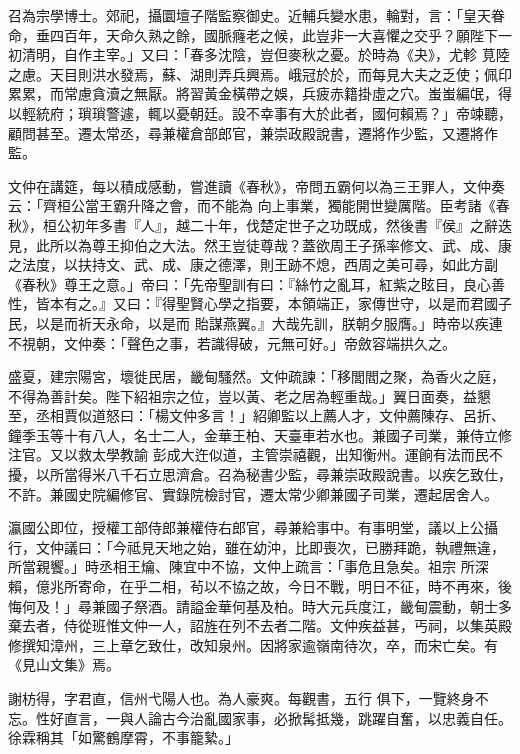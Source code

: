 \begin{pinyinscope}
 召為宗學博士。郊祀，攝圜壇子階監察御史。近輔兵變水患，輪對，言：「皇天眷命，垂四百年，天命久熟之餘，國脈癃老之候，此豈非一大喜懼之交乎？願陛下一初清明，自作主宰。」又曰：「春多沈陰，豈但麥秋之憂。於時為《夬》，尤軫
 莧陸之慮。天目則洪水發焉，蘇、湖則弄兵興焉。峨冠於於，而每見大夫之乏使；佩印累累，而常慮貪瀆之無厭。將習黃金橫帶之娛，兵疲赤籍掛虛之穴。蚩蚩編氓，得以輕統府；瑣瑣警遽，輒以憂朝廷。設不幸事有大於此者，國何賴焉？」帝竦聽，顧問甚至。遷太常丞，尋兼權倉部郎官，兼崇政殿說書，遷將作少監，又遷將作監。



 文仲在講筵，每以積成感動，嘗進讀《春秋》，帝問五霸何以為三王罪人，文仲奏云：「齊桓公當王霸升降之會，而不能為
 向上事業，獨能開世變厲階。臣考諸《春秋》，桓公初年多書『人』，越二十年，伐楚定世子之功既成，然後書『侯』之辭迭見，此所以為尊王抑伯之大法。然王豈徒尊哉？蓋欲周王子孫率修文、武、成、康之法度，以扶持文、武、成、康之德澤，則王跡不熄，西周之美可尋，如此方副《春秋》尊王之意。」帝曰：「先帝聖訓有曰：『絲竹之亂耳，紅紫之眩目，良心善性，皆本有之。』又曰：『得聖賢心學之指要，本領端正，家傳世守，以是而君國子民，以是而祈天永命，以是而
 貽謀燕翼。』大哉先訓，朕朝夕服膺。」時帝以疾連不視朝，文仲奏：「聲色之事，若識得破，元無可好。」帝斂容端拱久之。



 盛夏，建宗陽宮，壞徙民居，畿甸騷然。文仲疏諫：「移閭閻之聚，為香火之庭，不得為善計矣。陛下紹祖宗之位，豈以黃、老之居為輕重哉。」翼日面奏，益懇至，丞相賈似道怒曰：「楊文仲多言！」紹卿監以上薦人才，文仲薦陳存、呂折、鐘季玉等十有八人，名士二人，金華王柏、天臺車若水也。兼國子司業，兼侍立修注官。又以救太學教諭
 彭成大迕似道，主管崇禧觀，出知衡州。運餉有法而民不擾，以所當得米八千石立思濟倉。召為秘書少監，尋兼崇政殿說書。以疾乞致仕，不許。兼國史院編修官、實錄院檢討官，遷太常少卿兼國子司業，遷起居舍人。



 瀛國公即位，授權工部侍郎兼權侍右郎官，尋兼給事中。有事明堂，議以上公攝行，文仲議曰：「今祗見天地之始，雖在幼沖，比即喪次，已勝拜跪，執禮無違，所當親饗。」時丞相王爚、陳宜中不協，文仲上疏言：「事危且急矣。祖宗
 所深賴，億兆所寄命，在乎二相，茍以不協之故，今日不戰，明日不征，時不再來，後悔何及！」尋兼國子祭酒。請謚金華何基及柏。時大元兵度江，畿甸震動，朝士多棄去者，侍從班惟文仲一人，詔旌在列不去者二階。文仲疾益甚，丐祠，以集英殿修撰知漳州，三上章乞致仕，改知泉州。因將家逾嶺南待次，卒，而宋亡矣。有《見山文集》焉。



 謝枋得，字君直，信州弋陽人也。為人豪爽。每觀書，五行
 俱下，一覽終身不忘。性好直言，一與人論古今治亂國家事，必掀髯抵幾，跳躍自奮，以忠義自任。徐霖稱其「如驚鶴摩霄，不事籠縶。」




\end{pinyinscope}
